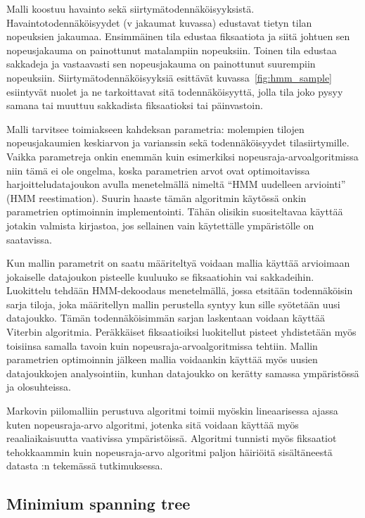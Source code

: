 Malli koostuu havainto sekä siirtymätodennäköisyyksistä. Havaintotodennäköisyydet (v jakaumat kuvassa) edustavat tietyn tilan nopeuksien jakaumaa. Ensimmäinen tila edustaa fiksaatiota ja siitä johtuen sen nopeusjakauma on painottunut matalampiin nopeuksiin. Toinen tila edustaa sakkadeja ja vastaavasti sen nopeusjakauma on painottunut suurempiin nopeuksiin. Siirtymätodennäköisyyksiä esittävät kuvassa~\ref{fig:hmm_sample} esiintyvät nuolet ja ne tarkoittavat sitä todennäköisyyttä, jolla tila joko pysyy samana tai muuttuu sakkadista fiksaatioksi tai päinvastoin.

Malli tarvitsee toimiakseen kahdeksan parametria: molempien tilojen nopeusjakaumien keskiarvon ja varianssin sekä todennäköisyydet tilasiirtymille. Vaikka parametreja onkin enemmän kuin esimerkiksi nopeusraja-arvoalgoritmissa niin tämä ei ole ongelma, koska parametrien arvot ovat optimoitavissa harjoitteludatajoukon avulla menetelmällä nimeltä ``HMM uudelleen arviointi'' (HMM reestimation).\citep[s. 180]{salvucci1999} Suurin haaste tämän algoritmin käytössä onkin parametrien optimoinnin implementointi. Tähän olisikin suositeltavaa käyttää jotakin valmista kirjastoa, jos sellainen vain käytettälle ympäristölle on saatavissa.

Kun mallin parametrit on saatu määriteltyä voidaan mallia käyttää arvioimaan jokaiselle datajoukon pisteelle kuuluuko se fiksaatiohin vai sakkadeihin. Luokittelu tehdään HMM-dekoodaus menetelmällä, jossa etsitään todennäköisin sarja tiloja, joka määritellyn mallin perustella syntyy kun sille syötetään uusi datajoukko. Tämän todennäköisimmän sarjan laskentaan voidaan käyttää Viterbin algoritmia.\citep[s. 178]{salvucci1999}  Peräkkäiset fiksaatioiksi luokitellut pisteet yhdistetään myös toisiinsa samalla tavoin kuin nopeusraja-arvoalgoritmissa tehtiin.\citep[s. 31]{salvucci1999} Mallin parametrien optimoinnin jälkeen mallia voidaankin käyttää myös uusien datajoukkojen analysointiin, kunhan datajoukko on kerätty samassa ympäristössä ja olosuhteissa.

Markovin piilomalliin perustuva algoritmi toimii myöskin lineaarisessa ajassa kuten nopeusraja-arvo algoritmi, jotenka sitä voidaan käyttää myös reaaliaikaisuutta vaativissa ympäristöissä. Algoritmi tunnisti myös fiksaatiot tehokkaammin kuin nopeusraja-arvo algoritmi paljon häiriöitä sisältäneestä datasta \citet[s. 32]{salvucci1999}:n tekemässä tutkimuksessa.

\subsection{Minimium spanning tree}
